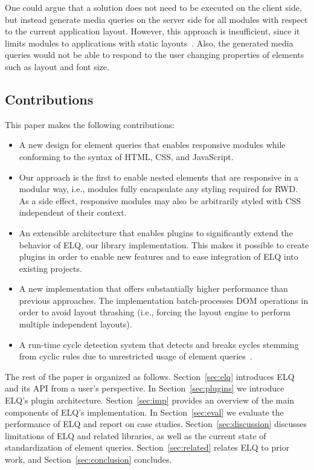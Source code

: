 \documentclass{acm_proc_article-sp}
\newcommand{\elq}{ELQ}
\begin{document}
      One could argue that a solution does not need to be executed on the client side, but instead generate media queries on the server side for all modules with respect to the current application layout.
      However, this approach is insufficient, since it limits modules to applications with static layouts~\cite{elq-thesis}. Also, the generated media queries would not be able to respond to the user changing properties of elements such as layout and font size.

    \subsection{Contributions}
      This paper makes the following contributions:
      \begin{itemize}
        \item A new design for element queries that enables responsive modules while conforming to the syntax of HTML, CSS, and JavaScript.
        \item
          Our approach is the first to enable nested elements that are responsive in a modular way, i.e., modules fully encapsulate any styling required for RWD.
          As a side effect, responsive modules may also be arbitrarily styled with CSS independent of their context.
        \item
          An extensible architecture that enables plugins to significantly extend the behavior of ELQ, our library implementation.
          This makes it possible to create plugins in order to enable new features and to ease integration of \elq{} into existing projects.
        \item
          A new implementation that offers substantially higher performance than previous approaches.
          The implementation batch-processes DOM operations in order to avoid layout thrashing (i.e., forcing the layout engine to perform multiple independent layouts).
        \item
          A run-time cycle detection system that detects and breaks cycles stemming from cyclic rules due to unrestricted usage of element queries~\cite{elq-thesis}.
      \end{itemize}

    The rest of the paper is organized as follows.
    Section~\ref{sec:elq} introduces \elq{} and its API from a user's perspective.
    In Section~\ref{sec:plugins} we introduce \elq{}'s plugin architecture.
    Section~\ref{sec:imp} provides an overview of the main components of \elq{}'s implementation.
    In Section~\ref{sec:eval} we evaluate the performance of \elq{} and report on case studies.
    Section~\ref{sec:discussion} discusses limitations of \elq{} and related libraries, as well as the current state of standardization of element queries.
    Section~\ref{sec:related} relates \elq{} to prior work, and Section~\ref{sec:conclusion} concludes.
\end{document}

